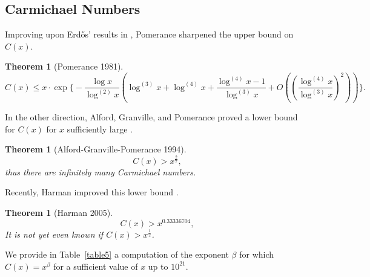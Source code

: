 \documentclass[11pt]{article}
\theoremstyle{plain}
\newtheorem{theorem}[subsubsection]{Theorem}
\theoremstyle{definition}
\theoremstyle{remark}
\numberwithin{equation}{subsection}
\begin{document}
\subsection{Carmichael Numbers}
Improving upon Erd\H{o}s' results in \cite{17}, Pomerance \cite{11} sharpened the upper bound on $C(x)$.
\begin{theorem}[Pomerance 1981] \label{carm1}
\begin{equation} \label{12}
C(x) \le x \cdot \exp\Big\{-\frac{\log x}{\log^{(2)} x}\left(\log^{(3)} x + \log^{(4)} x + \frac{\log^{(4)} x - 1}{\log^{(3)} x}+O\left(\left(\frac{\log^{(4)} x}{\log^{(3)} x}\right)^2\right)\right)\Bigr\}.
\end{equation}
\end{theorem}
In the other direction, Alford, Granville, and Pomerance proved a lower bound for $C(x)$ for $x$ sufficiently large \cite{15}.
\begin{theorem}[Alford-Granville-Pomerance 1994] \label{carm2}
\begin{equation} \label{13}
C(x) > x^{\frac{2}{7}},
\end{equation}
thus there are infinitely many Carmichael numbers.
\end{theorem}
Recently, Harman improved this lower bound \cite{18}.
\begin{theorem}[Harman 2005] \label{carm3}
\begin{equation} \label{14}
C(x) > x^{0.33336704},
\end{equation}
It is not yet even known if $C(x) > x^{\frac{1}{2}}$.
\end{theorem}
We provide in Table~\ref{table5} a computation of the exponent $\beta$ for which $C(x) = x^{\beta}$ for a sufficient value of $x$ up to $10^{21}$.
\end{document}

